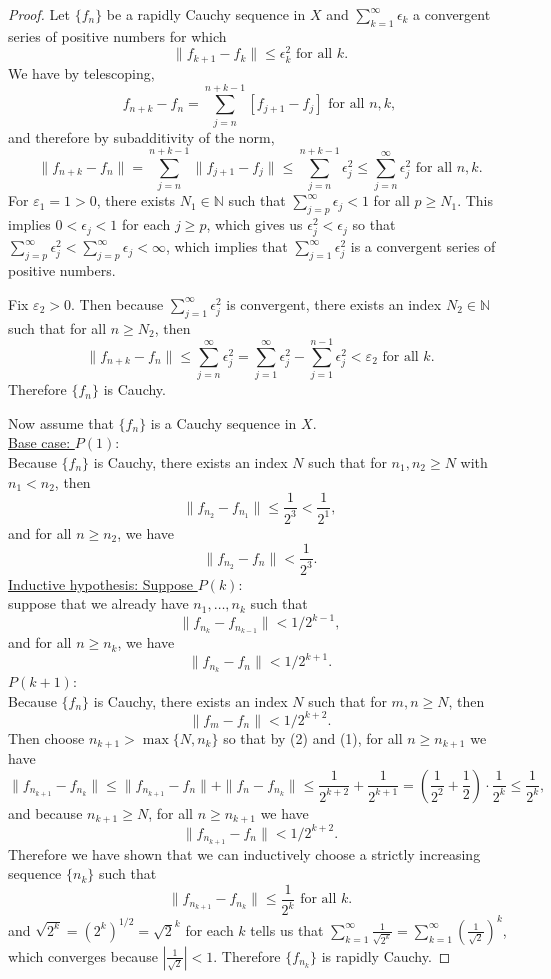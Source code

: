 \begin{proof}
	Let $\{f_n\}$ be a rapidly Cauchy sequence in $X$ and $\sum_{k=1}^\infty\epsilon_k$ a convergent series of positive numbers for which 
	\[
		\|f_{k+1}-f_k\|\le\epsilon_k^2\text{ for all }k.
	\]
	We have by telescoping, 
	\[
		f_{n+k}-f_n=\sum_{j=n}^{n+k-1}[f_{j+1}-f_j]\text{ for all }n,k,
	\]
	and therefore by subadditivity of the norm,
	\[
		\|f_{n+k}-f_n\|=\sum_{j=n}^{n+k-1}\|f_{j+1}-f_j\|\le\sum_{j=n}^{n+k-1}\epsilon_j^2\le\sum_{j=n}^\infty\epsilon_j^2\text{ for all }n,k.
	\]
	For $\varepsilon_1=1>0$, there exists $N_1\in\mathbb{N}$ such that $\sum_{j=p}^\infty\epsilon_j<1$ for all $p\ge N_1$.
	This implies $0<\epsilon_j<1$ for each $j\ge p$, which gives us $\epsilon_j^2<\epsilon_j$ so that $\sum_{j=p}^\infty\epsilon_j^2<\sum_{j=p}^\infty\epsilon_j<\infty$, which implies that $\sum_{j=1}^\infty\epsilon_j^2$ is a convergent series of positive numbers.
	
	Fix $\varepsilon_2>0$.
	Then because $\sum_{j=1}^\infty\epsilon_j^2$ is convergent, there exists an index $N_2\in\mathbb{N}$ such that for all $n\ge N_2$, then 
	\[
		\|f_{n+k}-f_n\|\le\sum_{j=n}^\infty\epsilon_j^2=\sum_{j=1}^\infty\epsilon_j^2-\sum_{j=1}^{n-1}\epsilon_j^2<\varepsilon_2\text{ for all }k.
	\]
	Therefore $\{f_n\}$ is Cauchy.

	Now assume that $\{f_n\}$ is a Cauchy sequence in $X$.
	\\\underline{Base case: $P(1)$}:
	\\Because $\{f_n\}$ is Cauchy, there exists an index $N$ such that for $n_1,n_2\ge N$ with $n_1<n_2$, then 
	\[
		\|f_{n_2}-f_{n_1}\|\le\frac{1}{2^3}<\frac{1}{2^1},
	\]
	and for all $n\ge n_{2}$, we have
	\[
		\|f_{n_2}-f_n\|<\frac{1}{2^3}.
	\]
	\underline{Inductive hypothesis: Suppose $P(k)$}: 
	\\suppose that we already have $n_1,\dots,n_k$ such that
	\[
		\|f_{n_{k}}-f_{n_{k-1}}\|<1/2^{k-1},
	\]
	and for all $n\ge n_{k}$, we have
	\[
		\|f_{n_{k}}-f_{n}\|<1/2^{k+1}.\tag{1}
	\]
	\underline{$P(k+1)$}:
	\\Because $\{f_n\}$ is Cauchy, there exists an index $N$ such that for $m,n\ge N$, then 
	\[
		\|f_m-f_n\|<1/2^{k+2}.\tag{2}
	\]
	Then choose $n_{k+1}>\max\{N,n_k\}$ so that by (2) and (1), for all $n\ge n_{k+1}$ we have
	\[
		\|f_{n_{k+1}}-f_{n_{k}}\|\le\|f_{n_{k+1}}-f_n\|+\|f_n-f_{n_{k}}\|\le\frac{1}{2^{k+2}}+\frac{1}{2^{k+1}}=(\frac{1}{2^2}+\frac{1}{2})\cdot\frac{1}{2^{k}}\le\frac{1}{2^{k}},
	\]
	and because $n_{k+1}\ge N$, for all $n\ge n_{k+1}$ we have
	\[
		\|f_{n_{k+1}}-f_{n}\|<1/2^{k+2}.
	\]
	Therefore we have shown that we can inductively choose a strictly increasing sequence $\{n_k\}$ such that 
	\[
		\|f_{n_{k+1}}-f_{n_k}\|\le\frac{1}{2^k}\text{ for all }k.
	\]
	and $\sqrt{2^k}=(2^k)^{1/2}=\sqrt{2}^k$ for each $k$ tells us that $\sum_{k=1}^\infty\frac{1}{\sqrt{2^k}}=\sum_{k=1}^\infty(\frac{1}{\sqrt{2}})^k$, which converges because $\left|\frac{1}{\sqrt{2}}\right|<1$.
	Therefore $\{f_{n_k}\}$ is rapidly Cauchy.
\end{proof}
